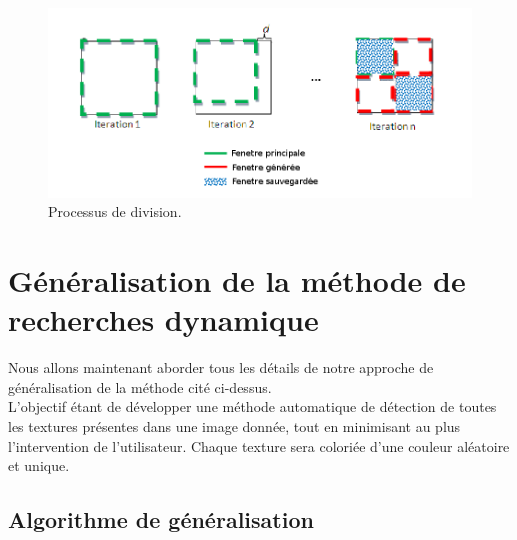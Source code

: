 


\begin{figure}[H]
	\centering
		\includegraphics[width=14cm,]{Figures/chap2/1.png}
		
	\caption[division]{Processus de division.}
	\label{fig:division}
\end{figure}

\section{Généralisation de la méthode de recherches dynamique}

\indent Nous allons maintenant aborder tous les détails de notre approche de généralisation de la méthode cité ci-dessus.\\

\indent L'objectif étant de développer une méthode automatique de détection de toutes les textures présentes dans une image donnée, tout en minimisant au plus l'intervention de l'utilisateur. Chaque texture sera coloriée d'une couleur aléatoire et unique.

\subsection{Algorithme de généralisation}


